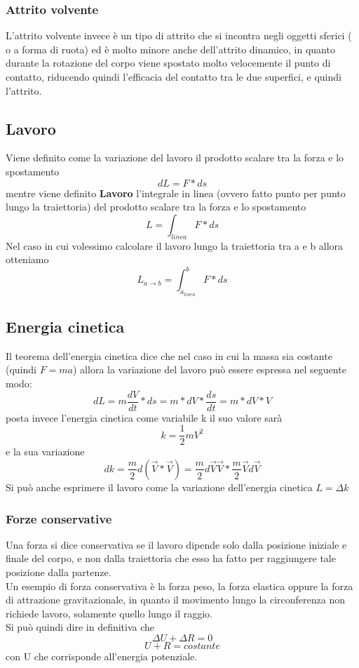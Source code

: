 \documentclass[portrait]{article}
\begin{document}
\subsubsection{Attrito volvente}
L'attrito volvente invece è un tipo di attrito che si incontra negli oggetti sferici ( o a forma di ruota) ed è molto minore anche dell'attrito dinamico, in quanto durante la rotazione del corpo viene spostato molto velocemente il punto di contatto, riducendo quindi l'efficacia del contatto tra le due superfici, e quindi l'attrito.
\subsection{Lavoro}
Viene definito come la variazione del lavoro il prodotto scalare tra la forza e lo spostamento 
$$dL = F * ds$$
mentre viene definito \textbf{Lavoro} l'integrale in linea (ovvero fatto punto per punto lungo la traiettoria) del prodotto scalare tra la forza e lo spostamento
$$L = \int_{linea}F * ds$$
Nel caso in cui volessimo calcolare il lavoro lungo la traiettoria tra a e b allora otteniamo
$$L_{a \to b} = \int_{a_{linea}}^b F *ds$$
\subsection{Energia cinetica}
Il teorema dell'energia cinetica dice che nel caso in cui la massa sia costante (quindi $F = ma$) allora la variazione del lavoro può essere espressa nel seguente modo:
$$dL = m\frac{dV}{dt}*ds = m*dV*\frac{ds}{dt} = m*dV*V$$
posta invece l'energia cinetica come variabile k il suo valore sarà 
$$k = \frac{1}{2}mV^2$$
e la sua variazione
$$dk= \frac{m}{2}d(\overrightarrow{V} * \overrightarrow{V}) = \frac{m}{2}d\overrightarrow{V}\overrightarrow{V} * \frac{m}{2}\overrightarrow{V}d\overrightarrow{V}$$
Si può anche esprimere il lavoro come la variazione dell'energia cinetica $L = \Delta k$
\subsubsection{Forze conservative}
Una forza si dice conservativa se il lavoro dipende solo dalla posizione iniziale e finale del corpo, e non dalla traiettoria che esso ha fatto per raggiungere tale posizione dalla partenze. \\ 
Un esempio di forza conservativa è la forza peso, la forza elastica oppure la forza di attrazione gravitazionale, in quanto il movimento lungo la circonferenza non richiede lavoro, solamente quello lungo il raggio. \\
Si può quindi dire in definitiva che 
$$\Delta U + \Delta R = 0$$
$$U + R = costante$$
con U che corrisponde all'energia potenziale.
\end{document}
